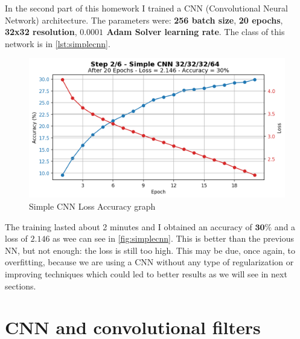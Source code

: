 \documentclass[a4paper, 11pt]{article}
\begin{document}
	
	In the second part of this homework I trained a CNN (Convolutional Neural Network) architecture. The parameters were: \textbf{256 batch size}, \textbf{20 epochs}, \textbf{32x32 resolution}, \textbf{$\boldsymbol{0.0001}$ Adam Solver learning rate}. The class of this network is in \vref{lst:simplecnn}.
	
	\newpage
	\begin{figure}[ht!]
		\centering
		\includegraphics[width=0.65\paperwidth]{img/fig02.png}
		\caption{Simple CNN Loss Accuracy graph}
		\label{fig:simplecnn}
	\end{figure}

	The training lasted about 2 minutes and I obtained an accuracy of $\boldsymbol{30\%}$ and a loss of $\boldsymbol{2.146}$ as wee can see in \vref{fig:simplecnn}.
	This is better than the previous NN, but not enough: the loss is still too high. This may be due, once again, to overfitting, because we are using a CNN without any type of regularization or improving techniques which could led to better results as we will see in next sections.
	
	
	\section{CNN and convolutional filters}
	
\end{document}
